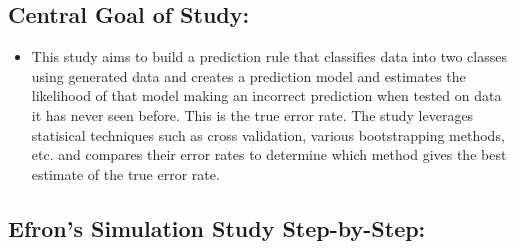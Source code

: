 \documentclass[
  letterpaper,
  DIV=11,
  numbers=noendperiod]{scrreprt}
\providecommand{\tightlist}{%
  \setlength{\itemsep}{0pt}\setlength{\parskip}{0pt}}
\begin{document}
\subsection{Central Goal of Study:}\label{central-goal-of-study}

\begin{itemize}
\tightlist
\item
  This study aims to build a prediction rule that classifies data into
  two classes using generated data and creates a prediction model and
  estimates the likelihood of that model making an incorrect prediction
  when tested on data it has never seen before. This is the true error
  rate. The study leverages statisical techniques such as cross
  validation, various bootstrapping methods, etc. and compares their
  error rates to determine which method gives the best estimate of the
  true error rate.
\end{itemize}

\subsection{Efron's Simulation Study
Step-by-Step:}\label{efrons-simulation-study-step-by-step}
\end{document}
